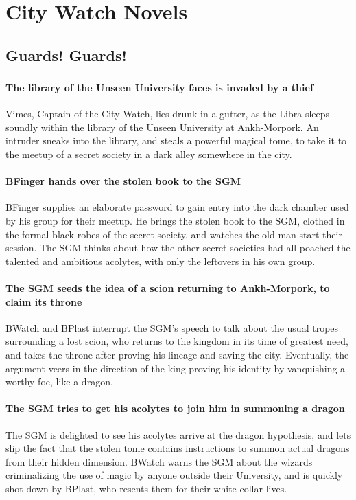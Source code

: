 \chapter{City Watch Novels}


\section{Guards! Guards!}


\subsection{}
\subsubsection{The library of the Unseen University faces is invaded by a thief}
\Gls{Vimes}, Captain of the City Watch, lies drunk in a gutter, as the \Gls{Libra} sleeps soundly
within the library of the Unseen University at Ankh-Morpork. An intruder sneaks into the library,
and steals a powerful magical tome, to take it to the meetup of a secret society in a dark alley
somewhere in the city.

\subsubsection{\Gls{BFinger} hands over the stolen book to the \Gls{SGM}}
\Gls{BFinger} supplies an elaborate password to gain entry into the dark chamber used by his group
for their meetup. He brings the stolen book to the \Gls{SGM}, clothed in the formal black robes of
the secret society, and watches the old man start their session. The \Gls{SGM} thinks about how the
other secret societies had all poached the talented and ambitious acolytes, with only the leftovers
in his own group.

\subsubsection{The \Gls{SGM} seeds the idea of a scion returning to Ankh-Morpork, to claim its
    throne}
\Gls{BWatch} and \Gls{BPlast} interrupt the \Gls{SGM}'s speech to talk about the usual tropes
surrounding a lost scion, who returns to the kingdom in its time of greatest need, and takes the
throne after proving his lineage and saving the city. Eventually, the argument veers in the
direction of the king proving his identity by vanquishing a worthy foe, like a dragon.

\subsubsection{The \Gls{SGM} tries to get his acolytes to join him in summoning a dragon}
The \Gls{SGM} is delighted to see his acolytes arrive at the dragon hypothesis, and lets slip the
fact that the stolen tome contains instructions to summon actual dragons from their hidden
dimension. \Gls{BWatch} warns the \Gls{SGM} about the wizards criminalizing the use of magic by
anyone outside their University, and is quickly shot down by \Gls{BPlast}, who resents them for
their white-collar lives.

